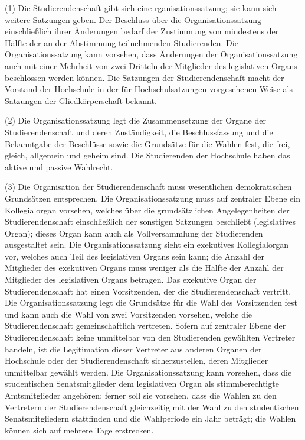 \documentclass[
10pt,
a4paper,
twoside,								%
titlepage=false,							%
draft=false								%
]{scrartcl}
\begin{document}
(1) Die Studierendenschaft gibt sich eine  rganisationssatzung; sie kann sich weitere Satzungen geben. Der  Beschluss über die Organisationssatzung einschließlich ihrer Änderungen  bedarf der Zustimmung von mindestens der Hälfte der an der Abstimmung  teilnehmenden Studierenden. Die Organisationssatzung kann vorsehen, dass  Änderungen der Organisationssatzung auch mit einer Mehrheit von zwei  Dritteln der Mitglieder des legislativen Organs beschlossen werden  können. Die Satzungen der Studierendenschaft macht der Vorstand der  Hochschule in der für Hochschulsatzungen vorgesehenen Weise als  Satzungen der Gliedkörperschaft bekannt.

(2) Die Organisationssatzung legt die  Zusammensetzung der Organe der Studierendenschaft und deren  Zuständigkeit, die Beschlussfassung und die Bekanntgabe der Beschlüsse  sowie die Grundsätze für die Wahlen fest, die frei, gleich, allgemein  und geheim sind. Die Studierenden der Hochschule haben das aktive und  passive Wahlrecht.

(3) Die Organisation der Studierendenschaft  muss wesentlichen demokratischen Grundsätzen entsprechen. Die  Organisationssatzung muss auf zentraler Ebene ein Kollegialorgan  vorsehen, welches über die grundsätzlichen Angelegenheiten der  Studierendenschaft einschließlich der sonstigen Satzungen beschließt  (legislatives Organ); dieses Organ kann auch als Vollversammlung der  Studierenden ausgestaltet sein. Die Organisationssatzung sieht ein  exekutives Kollegialorgan vor, welches auch Teil des legislativen Organs  sein kann; die Anzahl der Mitglieder des exekutiven Organs muss weniger  als die Hälfte der Anzahl der Mitglieder des legislativen Organs  betragen. Das exekutive Organ der Studierendenschaft hat einen  Vorsitzenden, der die Studierendenschaft vertritt. Die  Organisationssatzung legt die Grundsätze für die Wahl des Vorsitzenden  fest und kann auch die Wahl von zwei Vorsitzenden vorsehen, welche die  Studierendenschaft gemeinschaftlich vertreten. Sofern auf zentraler  Ebene der Studierendenschaft keine unmittelbar von den Studierenden  gewählten Vertreter handeln, ist die Legitimation dieser Vertreter aus  anderen Organen der Hochschule oder der Studierendenschaft  sicherzustellen, deren Mitglieder unmittelbar gewählt werden. Die  Organisationssatzung kann vorsehen, dass die studentischen  Senatsmitglieder dem legislativen Organ als stimmberechtigte  Amtsmitglieder angehören; ferner soll sie vorsehen, dass die Wahlen zu  den Vertretern der Studierendenschaft gleichzeitig mit der Wahl zu den  studentischen Senatsmitgliedern stattfinden und die Wahlperiode ein Jahr  beträgt; die Wahlen können sich auf mehrere Tage erstrecken.
\end{document}
